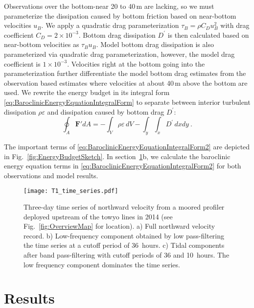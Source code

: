 \documentclass{ametsocV6.1}
\begin{document}
Observations over the bottom-near 20 to 40\,m are lacking, so we must parameterize the dissipation caused by bottom friction based on near-bottom velocities $u_B$.
We apply a quadratic drag parameterization $\tau_B = \rho C_D u_B^2$ with drag coefficient $C_D = 2\times10^{-3}$.
Bottom drag dissipation $D^\prime$ is then calculated based on near-bottom velocities as $\tau_B u_B$.
Model bottom drag dissipation is also parameterized via quadratic drag parameterization, however, the model drag coefficient is $1\times10^{-3}$.
Velocities right at the bottom going into the parameterization further differentiate the model bottom drag estimates from the observation based estimates where velocities at about 40\,m above the bottom are used.
We rewrite the energy budget in its integral form \eqref{eq:BaroclinicEnergyEquationIntegralForm} to separate between interior turbulent dissipation $\rho \varepsilon$ and dissipation caused by bottom drag $D^\prime$:
\begin{equation}
    \oint_A \mathbf{F'} dA = -\int_V \rho \varepsilon\,dV - \int_y \int_x D^\prime\,dx dy\ .
\label{eq:BaroclinicEnergyEquationIntegralForm2}
\end{equation}

The important terms of \eqref{eq:BaroclinicEnergyEquationIntegralForm2} are depicted in Fig.~\ref{fig:EnergyBudgetSketch}.  
In section~\ref{sec:Results}b, we calculate the baroclinic energy equation terms in \eqref{eq:BaroclinicEnergyEquationIntegralForm2} for both observations and model results.

\begin{figure}
\centerline{\texttt{[image: T1\_time\_series.pdf]}}
\caption{Three-day time series of northward velocity from a moored profiler deployed upstream of the towyo lines in 2014 (see Fig.~\ref{fig:OverviewMap} for location).
a) Full northward velocity record.
b) Low-frequency component obtained by low pass-filtering the time series at a cutoff period of 36~hours.
c) Tidal components after band pass-filtering with cutoff periods of 36 and 10~hours.
The low frequency component dominates the time series.
}
\label{fig:TimeDependence}
\end{figure}

\section{Results}\label{sec:Results}
\end{document}

